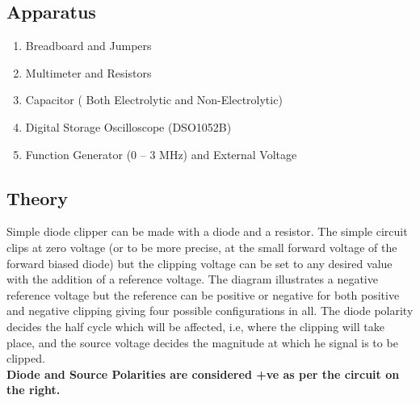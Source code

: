 \documentclass{article}
\begin{document}
\subsection{Apparatus}
\begin{enumerate}
\item Breadboard and Jumpers
\item Multimeter and Resistors
\item Capacitor ( Both Electrolytic and Non-Electrolytic)
\item Digital Storage Oscilloscope (DSO1052B)
\item Function Generator (0 – 3 MHz) and External Voltage
\end{enumerate}

\subsection{Theory}
\begin{figure}
\end{figure}
Simple diode clipper can be made with a diode and a resistor. The simple circuit clips at zero voltage (or to be more precise, at the small forward voltage of the forward biased diode) but the clipping voltage can be set to any desired value with the addition of a reference voltage. The diagram illustrates a negative reference voltage but the reference can be positive or negative for both positive and negative clipping giving four possible configurations in all. The diode polarity decides the half cycle which will be affected, i.e, where the clipping will take place, and the source voltage decides the magnitude at which he signal is to be clipped. \\

\noindent
\textbf{Diode and Source Polarities are considered +ve as per the circuit on the right.}
\end{document}

